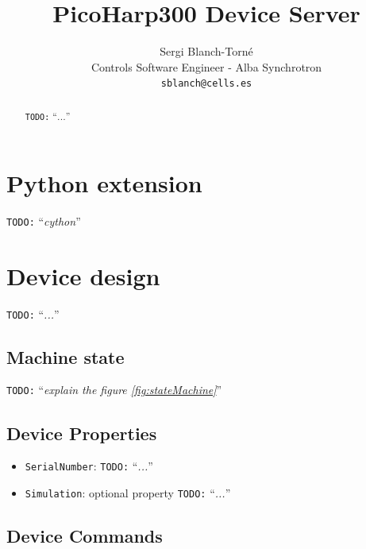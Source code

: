 \documentclass[a4paper,10pt]{article}
\title{PicoHarp300 Device Server}
\author{Sergi Blanch-Torn\'e\\\small{Controls Software Engineer - Alba Synchrotron}\\{\tt \small{sblanch@cells.es}}}
\newcommand{\todo}[1]{\texttt{\color{red}TODO:} ``\emph{#1}''}
\begin{document}
\maketitle

\begin{abstract}
\todo{...}
\end{abstract}

\section{Python extension}

\todo{cython}

\section{Device design}

\todo{...}

\subsection{Machine state}

\begin{figure}[h]
\end{figure}

\todo{explain the figure \ref{fig:stateMachine}}

\subsection{Device Properties}

\begin{itemize}
    \item {\tt SerialNumber}: \todo{...}
    \item {\tt Simulation}: optional property \todo{...}
\end{itemize}

\subsection{Device Commands}
\end{document}
